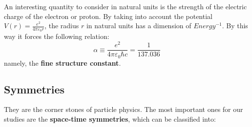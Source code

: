 \documentclass[../../main/main.tex]{subfiles}
\begin{document}
An interesting quantity to consider in natural units is the strength of the electric charge of the electron or proton. By taking into account the potential \( V(r) = \frac{e^2}{4 \pi \varepsilon_0 r} \), the radius \( r \) in natural units has a dimension of \( \si{Energy^{-1}} \). By this way it forces the following relation:
\begin{equation}
    \alpha
    \equiv
    \frac{e^2}{4\pi \varepsilon_0 \hbar c}
    =
    \frac{1}{137.036}
    \label{eq:L01_FSC}
\end{equation}
namely, the \textbf{fine structure constant}.



\subsection*{Symmetries}
They are the corner stones of particle physics. The most important ones for our studies are the \textbf{space-time symmetries}, which can be classified into:
\end{document}
